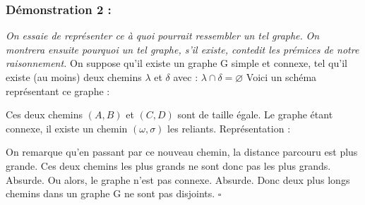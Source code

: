 \documentclass{article}
\begin{document}
        \subsubsection*{Démonstration 2 :}
            \textit{On essaie de représenter ce à quoi pourrait ressembler un tel graphe.}
            \textit{On montrera ensuite pourquoi un tel graphe, s'il existe, contedit les prémices de notre raisonnement.}
            \linebreak
            On suppose qu'il existe un graphe G simple et connexe, tel qu'il existe (au moins) deux chemins $\lambda$ et $\delta$ avec :
            $
            \lambda \cap \delta = \varnothing
            $
            Voici un schéma représentant ce graphe :
            \begin{center}
            \end{center}
            Ces deux chemins $(A,B)$ et $(C,D)$ sont de taille égale.
            Le graphe étant connexe, il existe un chemin $(\omega,\sigma)$ les reliants.
            Représentation :
            \begin{center}
            \end{center}
            On remarque qu'en passant par ce nouveau chemin, la distance parcouru est plus grande.
            Ces deux chemins les plus grands ne sont donc pas les plus grands. Absurde.
            Ou alors, le graphe n'est pas connexe. Absurde.
            Donc deux plus longs chemins dans un graphe G ne sont pas disjoints.
            $\square $
\end{document}
